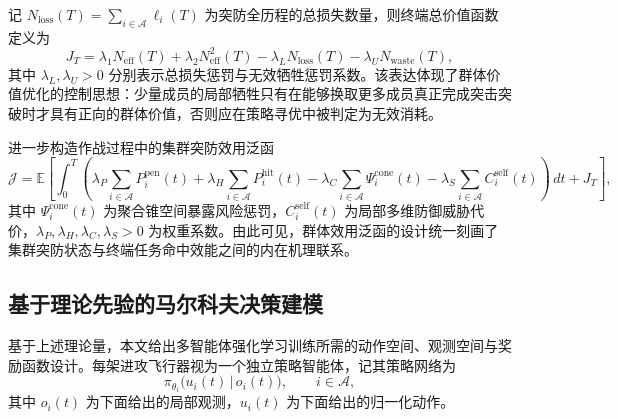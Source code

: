 记 $N_{\mathrm{loss}}(T)=\sum_{i\in\mathcal{A}}\ell_i(T)$ 为突防全历程的总损失数量，则终端总价值函数定义为
\begin{equation}
J_T
=
\lambda_1 N_{\mathrm{eff}}(T)
+
\lambda_2 N_{\mathrm{eff}}^2(T)
-
\lambda_L N_{\mathrm{loss}}(T)
-
\lambda_U N_{\mathrm{waste}}(T),
\end{equation}
其中 $\lambda_L,\lambda_U>0$ 分别表示总损失惩罚与无效牺牲惩罚系数。该表达体现了群体价值优化的控制思想：少量成员的局部牺牲只有在能够换取更多成员真正完成突击突破时才具有正向的群体价值，否则应在策略寻优中被判定为无效消耗。

进一步构造作战过程中的集群突防效用泛函
\begin{equation}
\mathcal J
=
\mathbb E\left[
\int_0^T
\left(
\lambda_P \sum_{i\in\mathcal{A}} P_i^{\mathrm{pen}}(t)
+
\lambda_H \sum_{i\in\mathcal{A}} P_i^{\mathrm{hit}}(t)
-
\lambda_C \sum_{i\in\mathcal{A}} \Psi_i^{\mathrm{cone}}(t)
-
\lambda_S \sum_{i\in\mathcal{A}} C_i^{\mathrm{self}}(t)
\right)\,dt
+
J_T
\right],
\end{equation}
其中 $\Psi_i^{\mathrm{cone}}(t)$ 为聚合锥空间暴露风险惩罚，$C_i^{\mathrm{self}}(t)$ 为局部多维防御威胁代价，$\lambda_P,\lambda_H,\lambda_C,\lambda_S>0$ 为权重系数。由此可见，群体效用泛函的设计统一刻画了集群突防状态与终端任务命中效能之间的内在机理联系。






\subsection{基于理论先验的马尔科夫决策建模}
\label{subsec:rl-design}

基于上述理论量，本文给出多智能体强化学习训练所需的动作空间、观测空间与奖励函数设计。每架进攻飞行器视为一个独立策略智能体，记其策略网络为
\begin{equation}
\pi_{\theta_i}\bigl(u_i(t)\,\big|\,o_i(t)\bigr),\qquad i\in\mathcal{A},
\end{equation}
其中 $o_i(t)$ 为下面给出的局部观测，$u_i(t)$ 为下面给出的归一化动作。


